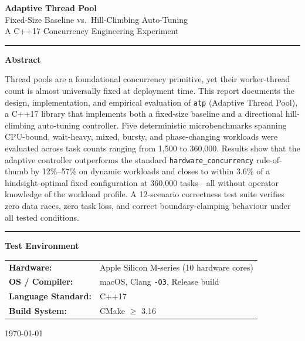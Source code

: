 \documentclass[12pt,a4paper]{article}
\begin{document}

\begin{titlepage}
\centering
\vspace*{2cm}

{\Huge\bfseries Adaptive Thread Pool}\\[0.5em]
{\Large Fixed-Size Baseline vs.\ Hill-Climbing Auto-Tuning}\\[0.3em]
{\large A C++17 Concurrency Engineering Experiment}

\vspace{1.5cm}
\rule{0.8\linewidth}{0.5pt}

\vspace{1cm}
{\large\bfseries Abstract}

\begin{minipage}{0.85\linewidth}
\normalsize
Thread pools are a foundational concurrency primitive, yet their worker-thread
count is almost universally fixed at deployment time.
This report documents the design, implementation, and empirical evaluation of
\texttt{atp} (Adaptive Thread Pool), a C++17 library that implements both a
fixed-size baseline and a directional hill-climbing auto-tuning controller.
Five deterministic microbenchmarks spanning CPU-bound, wait-heavy, mixed,
bursty, and phase-changing workloads were evaluated across task counts ranging
from 1,500 to 360,000.
Results show that the adaptive controller outperforms the standard
\texttt{hardware\_concurrency} rule-of-thumb by 12\%--57\% on dynamic workloads
and closes to within 3.6\% of a hindsight-optimal fixed configuration at
360,000 tasks---all without operator knowledge of the workload profile.
A 12-scenario correctness test suite verifies zero data races, zero task loss,
and correct boundary-clamping behaviour under all tested conditions.
\end{minipage}

\vspace{1.5cm}
\rule{0.8\linewidth}{0.5pt}

\vspace{0.8cm}
{\large\bfseries Test Environment}\\[0.4em]
\begin{tabular}{ll}
\textbf{Hardware:} & Apple Silicon M-series (10 hardware cores) \\
\textbf{OS / Compiler:} & macOS, Clang \texttt{-O3}, Release build \\
\textbf{Language Standard:} & C++17 \\
\textbf{Build System:} & CMake $\geq$ 3.16 \\
\end{tabular}

\vfill
{\small\today}
\end{titlepage}
\end{document}
